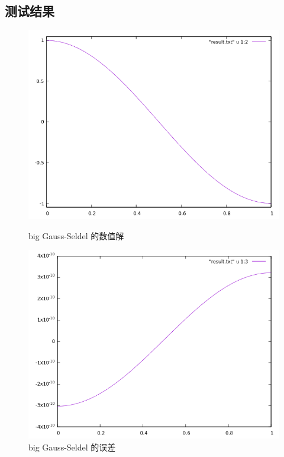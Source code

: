 \documentclass[lang=cn,11pt,a4paper]{elegantpaper}
\begin{document}
\subsection{测试结果}

\begin{figure}[H]
    \centering
    \begin{minipage}[t]{0.48\textwidth}
        \centering
        \includegraphics[width=0.9\linewidth]{png/p2-solution}
        \caption{\small big Gauss-Seldel 的数值解}
    \end{minipage}
    \hspace{1em}
    \begin{minipage}[t]{0.48\textwidth}
        \centering
        \includegraphics[width=0.9\linewidth]{png/p2-error}
        \caption{\small big Gauss-Seldel 的误差}
    \end{minipage}
\end{figure}
\end{document}
